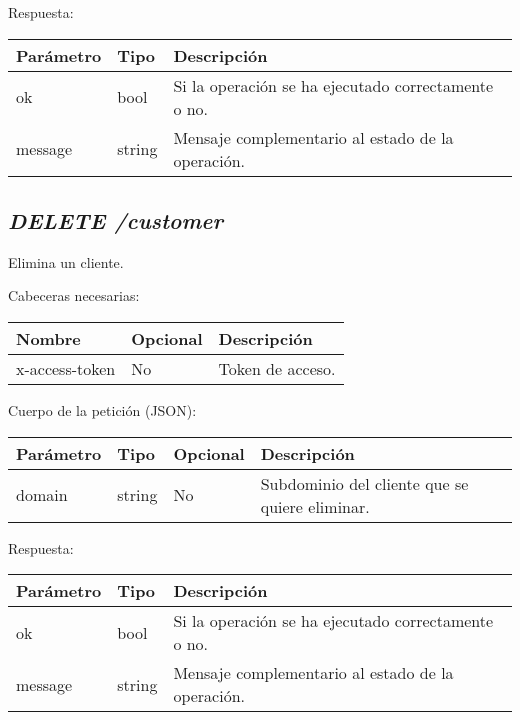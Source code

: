 Respuesta:
\begin{table}[!h]
	\centering
	\begin{adjustbox}{max width=\textwidth}
	\begin{tabular}{|l|l|l|}
		\hline
		Parámetro & Tipo & Descripción \\ \hline
		ok & bool & Si la operación se ha ejecutado correctamente o no. \\ \hline
		message & string & Mensaje complementario al estado de la operación. \\ \hline
	\end{tabular}
\end{adjustbox}
\end{table}






\subsection{\textit{DELETE /customer}}
Elimina un cliente.

Cabeceras necesarias:
\begin{table}[h!]
	\centering
	\begin{adjustbox}{max width=\textwidth}
	\begin{tabular}{|l|l|l|}
		\hline
		Nombre & Opcional & Descripción \\ \hline
		x-access-token & No & Token de acceso. \\ \hline
	\end{tabular}
\end{adjustbox}
\end{table}

Cuerpo de la petición (JSON):
\begin{table}[!h]
	\centering
	\begin{adjustbox}{max width=\textwidth}
	\begin{tabular}{|l|l|l|l|}
		\hline
		Parámetro & Tipo & Opcional & Descripción \\ \hline
		domain & string & No & Subdominio del cliente que se quiere eliminar. \\ \hline
	\end{tabular}
\end{adjustbox}
\end{table}

Respuesta:
\begin{table}[!h]
	\centering
	\begin{adjustbox}{max width=\textwidth}
	\begin{tabular}{|l|l|l|}
		\hline
		Parámetro & Tipo & Descripción \\ \hline
		ok & bool & Si la operación se ha ejecutado correctamente o no. \\ \hline
		message & string & Mensaje complementario al estado de la operación. \\ \hline
	\end{tabular}
\end{adjustbox}
\end{table}


